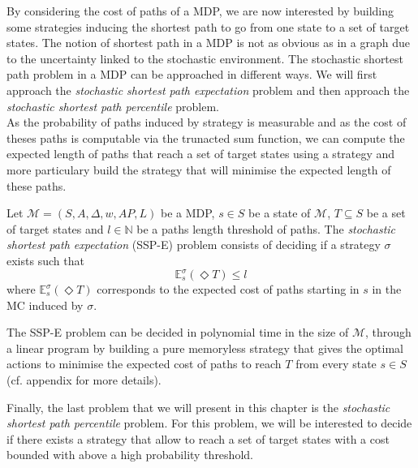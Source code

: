 By considering the cost of paths of a MDP, we are now interested by building some
strategies inducing the shortest path to go from one state to a set of target
states. The notion of shortest path in a MDP is not as obvious as in a graph due to the uncertainty linked to the stochastic environment.
The stochastic shortest path problem in a MDP can be approached in different
ways. We will first approach the \textit{stochastic shortest path expectation} problem and
then approach the \textit{stochastic shortest path percentile} problem. \\

As the probability of paths induced by strategy is measurable and
as the cost of theses paths is computable via the trunacted sum function, we can
compute the expected length of paths that reach a set of target states using a strategy and more particulary build the strategy that will minimise the expected length of these paths.

\begin{definition}
Let $\mathcal{M}=(S, A, \Delta, w, AP, L)$ be a MDP, $s \in S$ be a state of $\mathcal{M}$,
$T \subseteq S$ be a set of target states and $l \in \mathbb{N}$ be a paths length
threshold of paths. The \textit{stochastic shortest path expectation} (SSP-E) problem
consists of deciding if a strategy $\sigma$ exists such that
\[
  \mathbb{E}^\sigma_s(\Diamond T) \leq l
\]
where $\mathbb{E}_s^\sigma(\Diamond T)$ corresponds to the expected cost of paths starting in $s$ in the MC induced by $\sigma$.
\end{definition}

\begin{theorem}
  The SSP-E problem can be decided in polynomial time in the size of $\mathcal{M}$, through a linear program by building a pure memoryless strategy that gives the optimal actions to minimise the expected cost of paths to reach $T$ from every state $s \in S$ (cf. appendix for more details).
\end{theorem}

Finally, the last problem that we will present in this chapter is the
\textit{stochastic shortest path percentile} problem. For this problem, we will
be interested to decide if there exists a strategy that allow to reach a set of target states with
a cost bounded with above a high probability threshold.

